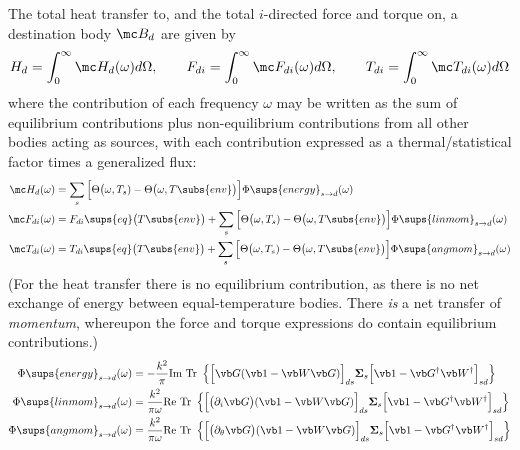 \documentclass[letterpaper]{article}
\newcommand{\vbSigma}{\boldsymbol{\Sigma}}
\begin{document}
The total heat transfer to, and the total $i$-directed 
force and torque on, a destination body $\mc B_d$ are given by
\begin{align*}
 H_d    = \int_0^\infty \mc H_d(\omega) d\Omega,         \qquad 
 F_{di} = \int_0^\infty \mc F_{di}(\omega) d\Omega, \qquad 
 T_{di} = \int_0^\infty \mc T_{di}(\omega) d\Omega
\end{align*}
where the contribution of each frequency $\omega$ may be written
as the sum of equilibrium contributions plus non-equilibrium
contributions from all other bodies acting as sources, with 
each contribution expressed as a thermal/statistical factor 
times a generalized flux: 
\begin{align*}
 \mc H_d(\omega)
 &= \sum_{s} 
    \Big[ \Theta\big(\omega,T_s) - \Theta\big(\omega, T\subs{env}\big) \Big]
    \Phi\sups{energy}_{s\to d}(\omega)
\\
 \mc F_{di}(\omega)
 &= F_{di}\sups{eq}\big( T\subs{env} \big)
   +\sum_{s} 
    \Big[ \Theta\big(\omega,T_s) - \Theta\big(\omega, T\subs{env}\big) \Big]
    \Phi\sups{lin mom}_{s\to d}(\omega)
\\
 \mc T_{di}(\omega)
 &= T_{di}\sups{eq}\big( T\subs{env} \big)
   +\sum_{s} 
    \Big[ \Theta\big(\omega,T_s) - \Theta\big(\omega, T\subs{env}\big) \Big]
    \Phi\sups{ang mom}_{s\to d}(\omega)
\end{align*}
(For the heat transfer there is no equilibrium contribution, as there
is no net exchange of energy between equal-temperature bodies. There
\textit{is} a net transfer of \textit{momentum}, whereupon the force and
torque expressions do contain equilibrium contributions.)
\begin{align*}
 \Phi\sups{energy}_{s\to d}(\omega)
&=-\frac{k^2}{\pi}\text{Im Tr }
   \left\{ 
           \Big[ \vb G (\vb 1 - \vb W \vb G)\Big]_{ds}
           \vbSigma_s
           \Big[\vb 1 - \vb G^\dagger \vb W^\dagger\Big]_{sd}
   \right\}
\\
 \Phi\sups{lin mom}_{s\to d}(\omega)
&= \frac{k^2}{\pi \omega}\text{Re Tr }
   \left\{ 
           \Big[ \big(\partial_i \vb G\big) (\vb 1 - \vb W \vb G)\Big]_{ds}
           \vbSigma_s
           \Big[\vb 1 - \vb G^\dagger \vb W^\dagger\Big]_{sd}
   \right\}
\\
 \Phi\sups{ang mom}_{s\to d}(\omega)
&= \frac{k^2}{\pi \omega}\text{Re Tr }
   \left\{ 
           \Big[ \big(\partial_\theta \vb G\big) (\vb 1 - \vb W \vb G)\Big]_{ds}
           \vbSigma_s
           \Big[\vb 1 - \vb G^\dagger \vb W^\dagger\Big]_{sd}
   \right\}
\end{align*}
\end{document}
